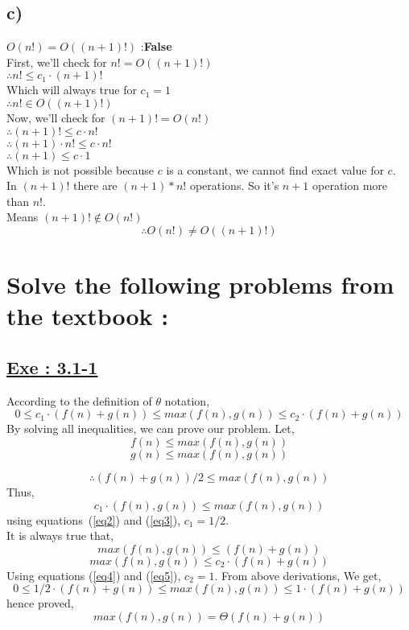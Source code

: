 \documentclass[a4paper, 11pt]{article}
\begin{document}
\subsection*{c)}
$O(n!) = O((n+1)!) $ :\textbf{False}\\
First, we'll check for $n! = O((n+1)!)$\\
$\therefore n! \le c_{1} \cdot (n+1)! $\\
Which will always true for $c_{1}=1$ \\
$\therefore n! \in O((n+1)!)$\\
Now, we'll check for $(n+1)! =O(n!)$\\
$\therefore (n+1)! \le c \cdot n!$\\
$\therefore (n+1)\cdot n! \le c \cdot n!$\\
$\therefore (n+1) \le c \cdot 1$\\
Which is not possible because $c$ is a constant, we cannot find exact value for $c$.\\
In $(n+1)!$ there are $(n+1)*n!$ operations. So it's $n+1$ operation more than $n!$.\\ Means $(n+1)! \notin O(n!)$
$$\therefore O(n!) \ne O((n+1)!)$$


\section{Solve the following problems from the textbook :}

\subsection*{\underline{Exe : 3.1-1}}
According to the definition of $\theta$ notation,\newline
\begin{equation}
\label{eq1}
0\leq c_{1}\cdot(f(n)+g(n)) \leq max(f(n),g(n)) \leq c_{2}\cdot(f(n)+g(n)) 
\end{equation}
By solving all inequalities, we can prove our problem.\newline
Let,
$$f(n) \leq max(f(n),g(n))$$
$$g(n) \leq max(f(n),g(n))$$

\begin{equation}
\label{eq2}
\therefore (f(n)+g(n))/2 \leq max(f(n),g(n))
\end{equation}
Thus, 
\begin{equation}
\label{eq3}
c_{1}\cdot(f(n),g(n)) \leq max(f(n),g(n))
\end{equation}
using equations~(\ref{eq2}) and (\ref{eq3}), $c_{1} = 1/2$.\\
It is always true that,\\
\begin{equation}
\label{eq4}
max(f(n),g(n)) \leq (f(n)+g(n))
\end{equation}
\begin{equation}
\label{eq5}
max(f(n),g(n)) \leq c_{2}\cdot(f(n)+g(n))
\end{equation}
Using equations (\ref{eq4}) and (\ref{eq5}), $c_{2} = 1.$\newline
From above derivations, We get,
$$0\le 1/2\cdot(f(n)+g(n)) \leq max(f(n),g(n)) \leq 1\cdot(f(n)+g(n))$$
hence proved, $$max(f(n),g(n)) = \Theta(f(n)+g(n))$$
\end{document}
